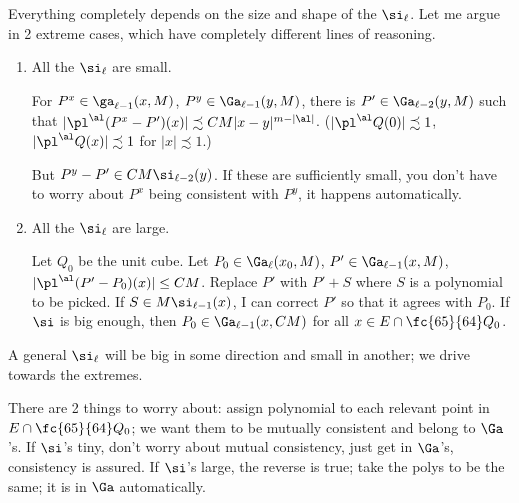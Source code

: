 Everything completely depends on the size and shape of the $\si_\ell$.
Let me argue in 2 extreme cases, which have completely different lines of reasoning.
\begin{enumerate}
\item
All the $\si_\ell$ are small. 

For $P^x\in \ga_{\ell-1}(x,M)$, $P^y\in \Ga_{\ell-1}(y,M)$, there is $P'\in \Ga_{\ell-2}(y,M)$ such that $|\pl^\al(P^x-P')(x)|\precsim CM|x-y|^{m-|\al|}$. 
($|\pl^\al Q(0)|\precsim 1$, $|\pl^\al Q(x)|\precsim 1$ for $|x|\precsim 1$.)

But $P^y-P'\in CM \si_{\ell-2}(y)$. If these are sufficiently small, you don't have to worry about $P^x$ being consistent with $P^y$, it happens automatically.
\item
All the $\si_\ell$ are large.

Let $Q_0$ be the unit cube. Let $P_0\in \Ga_\ell(x_0,M)$, $P'\in \Ga_{\ell-1}(x,M)$, $|\pl^\al(P'-P_0)(x)|\le CM$. 
Replace $P'$ with $P'+S$ where $S$ is a polynomial to be picked. 
If $S\in M\si_{\ell-1}(x)$, %
I can correct $P'$ so that it agrees with $P_0$.
If $\si$ is big enough, then $P_0\in \Ga_{\ell-1}(x,CM)$ for all $x\in E\cap \fc{65}{64}Q_0$. 
\end{enumerate}
A general $\si_\ell$ will be big in some direction and small in another; we drive towards the extremes.

There are 2 things  to worry about: assign polynomial to each relevant point in $E\cap \fc{65}{64}Q_0$; we want them to be mutually consistent and belong to $\Ga$'s. If $\si$'s tiny, don't worry about mutual consistency, just get in $\Ga$'s, consistency is assured. If $\si$'s large, the reverse is true; take the polys to be the same; it is in $\Ga$ automatically.

